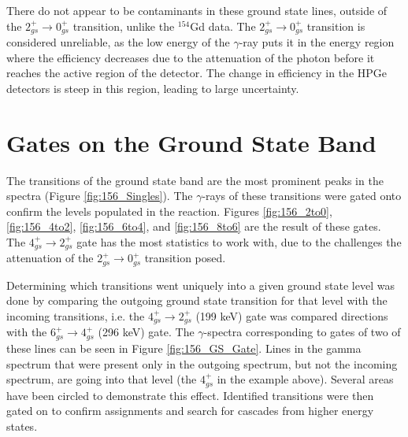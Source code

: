 \afterpage{}

There do not appear to be contaminants in these ground state lines, outside of the $2_{gs}^+\rightarrow0_{gs}^+$ transition, unlike the $^{154}$Gd data. The $2^+_{gs}\rightarrow 0^+_{gs}$ transition is considered unreliable, as the low energy of the $\gamma$-ray puts it in the energy region where the efficiency decreases due to the attenuation of the photon before it reaches the active region of the detector. The change in efficiency in the HPGe detectors is steep in this region, leading to large uncertainty.

\section{Gates on the Ground State Band}

The transitions of the ground state band are the most prominent peaks in the spectra (Figure \ref{fig:156_Singles}). The $\gamma$-rays of these transitions were gated onto confirm the levels populated in the reaction. Figures \ref{fig:156_2to0}, \ref{fig:156_4to2}, \ref{fig:156_6to4}, and \ref{fig:156_8to6} are the result of these gates. The $4_{gs}^+\rightarrow2_{gs}^+$ gate has the most statistics to work with, due to the challenges the attenuation of the $2^+_{gs}\rightarrow0_{gs}^+$ transition posed. 

\afterpage{\clearpage}

\afterpage{\clearpage}

\afterpage{\clearpage}

\afterpage{\clearpage}

Determining which transitions went uniquely into a given ground state level was done by comparing the outgoing ground state transition for that level with the incoming transitions, i.e. the $4_{gs}^+\rightarrow2_{gs}^+$ (199 keV) gate was compared directions with the $6_{gs}^+\rightarrow4_{gs}^+$ (296 keV) gate. The $\gamma$-spectra corresponding to gates of two of these lines can be seen in Figure \ref{fig:156_GS_Gate}. Lines in the gamma spectrum that were present only in the outgoing spectrum, but not the incoming spectrum, are going into that level (the $4_{gs}^+$ in the example above). Several areas have been circled to demonstrate this effect. Identified transitions were then gated on to confirm assignments and search for cascades from higher energy states.

